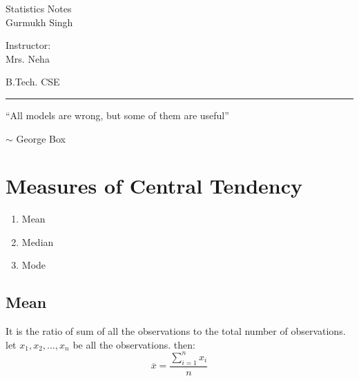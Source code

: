 \documentclass[11pt,letterpaper]{article}
\begin{document}
\begin{center}
  \Huge{Statistics Notes}\\
  \vspace{0.25cm}
  \small{Gurmukh Singh}
\end{center}

\vspace{-1.75cm}

\begin{flushright}
  Instructor: \\ Mrs. Neha
\end{flushright}

\vspace{-1.3cm}

\begin{flushleft}
  B.Tech. CSE
\end{flushleft}

\rule{15.5cm}{0.1mm}%

\tableofcontents
\pagebreak


\begin{mdframed}[backgroundcolor=gray!20]
   ``All models are wrong, but some of them are useful''
   \begin{flushright}
     $\sim$ George Box
   \end{flushright}
\end{mdframed}

\section{Measures of Central Tendency}
\begin{enumerate}
  \item Mean
  \item Median
  \item Mode
\end{enumerate}

\subsection{Mean}
It is the ratio of sum of all the observations to the total number of observations.
let $x_1, x_2, \dots, x_n$ be all the observations. then:
\[
  \overline{x} =\frac{\sum_{i=1}^n x_i}{n}
\]
\end{document}
